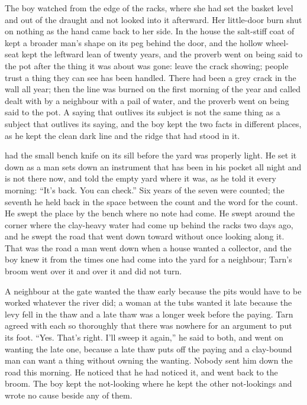 The boy watched from the edge of the racks, where she had set the basket level and out of the draught and not looked into it afterward. Her little-door burn shut on nothing as the hand came back to her side. In the house the salt-stiff coat of  kept a broader man's shape on its peg behind the door, and the hollow wheel-seat kept the leftward lean of twenty years, and the proverb went on being said to the pot after the thing it was about was gone: leave the crack showing; people trust a thing they can see has been handled. There had been a grey crack in the wall all year; then the line was burned on the first morning of the year and called dealt with by a neighbour with a pail of water, and the proverb went on being said to the pot. A saying that outlives its subject is not the same thing as a subject that outlives its saying, and the boy kept the two facts in different places, as he kept the clean dark line and the ridge that had stood in it.

\scenebreak

 had the small bench knife on its sill before the yard was properly light. He set it down as a man sets down an instrument that has been in his pocket all night and is not there now, and told the empty yard where it was, as he told it every morning: “It's back. You can check.” Six years of the seven were counted; the seventh he held back in the space between the count and the word for the count. He swept the place by the bench where no note had come. He swept around the corner where the clay-heavy water had come up behind the racks two days ago, and he swept the road that went down toward  without once looking along it. That was the road a man went down when a house wanted a collector, and the boy knew it from the times one had come into the yard for a neighbour; Tarn's broom went over it and over it and did not turn.

A neighbour at the gate wanted the thaw early because the pits would have to be worked whatever the river did; a woman at the tubs wanted it late because the levy fell in the thaw and a late thaw was a longer week before the paying. Tarn agreed with each so thoroughly that there was nowhere for an argument to put its foot. “Yes. That's right. I'll sweep it again,” he said to both, and went on wanting the late one, because a late thaw puts off the paying and a clay-bound man can want a thing without owning the wanting. Nobody sent him down the road this morning. He noticed that he had noticed it, and went back to the broom. The boy kept the not-looking where he kept the other not-lookings and wrote no cause beside any of them.

